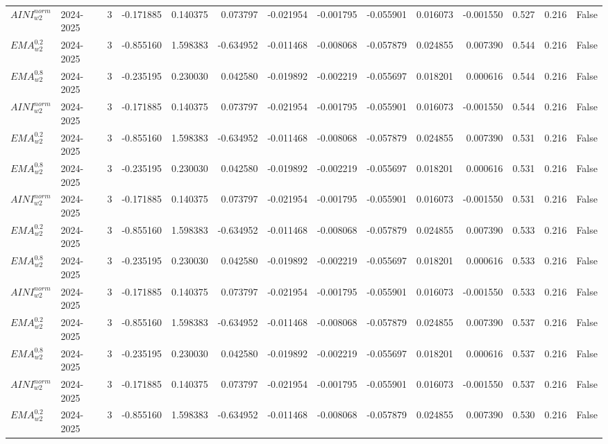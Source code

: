 \begin{tabular}{@{}llrrrrrrrrrlll@{}}
$AINI^{norm}_{w2}$ & 2024-2025 & 3 & -0.171885 & 0.140375 & 0.073797 & -0.021954 & -0.001795 & -0.055901 & 0.016073 & -0.001550 & 0.527 & 0.216 & False \\
$EMA^{0.2}_{w2}$ & 2024-2025 & 3 & -0.855160 & 1.598383 & -0.634952 & -0.011468 & -0.008068 & -0.057879 & 0.024855 & 0.007390 & 0.544 & 0.216 & False \\
$EMA^{0.8}_{w2}$ & 2024-2025 & 3 & -0.235195 & 0.230030 & 0.042580 & -0.019892 & -0.002219 & -0.055697 & 0.018201 & 0.000616 & 0.544 & 0.216 & False \\
$AINI^{norm}_{w2}$ & 2024-2025 & 3 & -0.171885 & 0.140375 & 0.073797 & -0.021954 & -0.001795 & -0.055901 & 0.016073 & -0.001550 & 0.544 & 0.216 & False \\
$EMA^{0.2}_{w2}$ & 2024-2025 & 3 & -0.855160 & 1.598383 & -0.634952 & -0.011468 & -0.008068 & -0.057879 & 0.024855 & 0.007390 & 0.531 & 0.216 & False \\
$EMA^{0.8}_{w2}$ & 2024-2025 & 3 & -0.235195 & 0.230030 & 0.042580 & -0.019892 & -0.002219 & -0.055697 & 0.018201 & 0.000616 & 0.531 & 0.216 & False \\
$AINI^{norm}_{w2}$ & 2024-2025 & 3 & -0.171885 & 0.140375 & 0.073797 & -0.021954 & -0.001795 & -0.055901 & 0.016073 & -0.001550 & 0.531 & 0.216 & False \\
$EMA^{0.2}_{w2}$ & 2024-2025 & 3 & -0.855160 & 1.598383 & -0.634952 & -0.011468 & -0.008068 & -0.057879 & 0.024855 & 0.007390 & 0.533 & 0.216 & False \\
$EMA^{0.8}_{w2}$ & 2024-2025 & 3 & -0.235195 & 0.230030 & 0.042580 & -0.019892 & -0.002219 & -0.055697 & 0.018201 & 0.000616 & 0.533 & 0.216 & False \\
$AINI^{norm}_{w2}$ & 2024-2025 & 3 & -0.171885 & 0.140375 & 0.073797 & -0.021954 & -0.001795 & -0.055901 & 0.016073 & -0.001550 & 0.533 & 0.216 & False \\
$EMA^{0.2}_{w2}$ & 2024-2025 & 3 & -0.855160 & 1.598383 & -0.634952 & -0.011468 & -0.008068 & -0.057879 & 0.024855 & 0.007390 & 0.537 & 0.216 & False \\
$EMA^{0.8}_{w2}$ & 2024-2025 & 3 & -0.235195 & 0.230030 & 0.042580 & -0.019892 & -0.002219 & -0.055697 & 0.018201 & 0.000616 & 0.537 & 0.216 & False \\
$AINI^{norm}_{w2}$ & 2024-2025 & 3 & -0.171885 & 0.140375 & 0.073797 & -0.021954 & -0.001795 & -0.055901 & 0.016073 & -0.001550 & 0.537 & 0.216 & False \\
$EMA^{0.2}_{w2}$ & 2024-2025 & 3 & -0.855160 & 1.598383 & -0.634952 & -0.011468 & -0.008068 & -0.057879 & 0.024855 & 0.007390 & 0.530 & 0.216 & False \\

\end{tabular}
